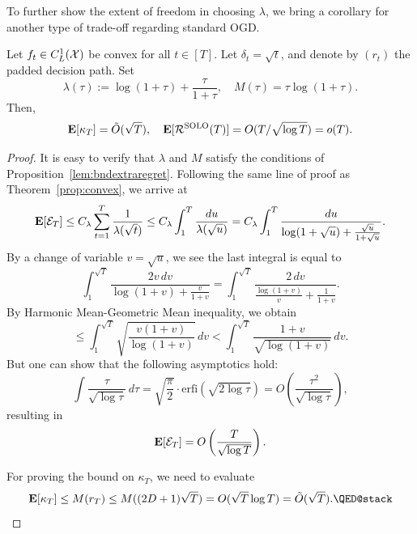To further show the extent of freedom in choosing $\lambda$, we bring a corollary for another type of trade-off regarding standard OGD.
\begin{corollary}
   Let $f_t\in C^1_L(\mathcal{X})$ be convex for all $t\in[T]$. Let $\delta_t = \sqrt{t}$, and denote by $(r_t)$ the padded decision path. Set
  \[
      \lambda(\tau) := \log(1+\tau) + \frac{\tau}{1+\tau}, \quad M(\tau) = \tau\log(1 + \tau).
  \]
  Then,
  \[
      \mathbf{E}[\kappa_T] = \tilde{O}(\sqrt{T}),\quad \mathbf{E}[\mathcal{R}^{\mathrm{SOLO}}(T)] = O(T/\sqrt{\log T}) = o(T).
  \]
\end{corollary}
\begin{proof}
    It is easy to verify that $\lambda$ and $M$ satisfy the conditions of Proposition~\ref{lem:bndextraregret}.  Following the same line of proof as Theorem~\ref{prop:convex}, we arrive at 
    \[
        \mathbf{E}[\mathcal{E}_T] \leq C_\lambda\sum_{t=1}^T \frac{1}{\lambda(\sqrt{t})} \leq C_\lambda\int_1^T \frac{du}{\lambda(\sqrt{u})} = C_\lambda \int_1^T \frac{du}{\log(1+ \sqrt{u}) + \frac{\sqrt{u}}{1+\sqrt{u}}}.
    \]
    By a change of variable $v = \sqrt{u}$, we see the last integral is equal to
    \[
        \int_1^{\sqrt{T}} \frac{2v\,dv}{\log(1+v) + \frac{v}{1+v}} = 
        \int_1^{\sqrt{T}} \frac{2\,dv}{\frac{\log(1+v)}{v} + \frac{1}{1+v}}.
    \]
    By Harmonic Mean-Geometric Mean inequality, we obtain
    \[
        \leq  \int_1^{\sqrt{T}} \sqrt{\frac{v(1+v)}{\log(1+v)}}\,dv < \int_1^{\sqrt{T}} \frac{1+v}{\sqrt{\log(1+v)}}\,dv.
    \]
    But one can show that the following asymptotics hold:
    \[
        \int \frac{\tau}{\sqrt{\log \tau}}\,d\tau = \sqrt{\frac{\pi}{2}}\cdot\mathrm{erfi}(\sqrt{2\log \tau}) = O\left(\frac{\tau^2}{\sqrt{\log \tau}}\right),
    \]
    resulting in
    \[
        \mathbf{E}[\mathcal{E}_T] = O\left(\frac{T}{\sqrt{\log T}}\right).
    \]

    For proving the bound on $\kappa_T$, we need to evaluate 
    \[
        \ev[\kappa_T] \leq M(r_T) \leq M((2D + 1)\sqrt{T}) = O(\sqrt{T}\log T) = \tilde{O}(\sqrt{T}). \qedhere
    \]
\end{proof}

